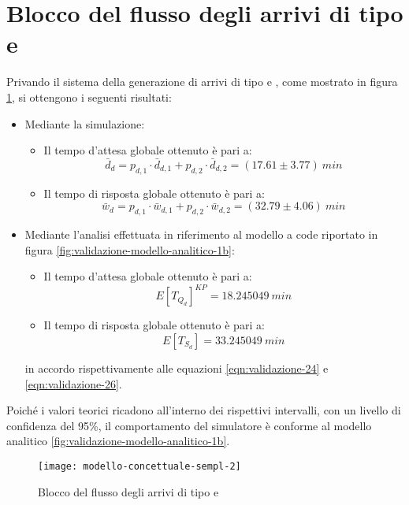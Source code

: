 \section{Blocco del flusso degli arrivi di tipo \uo{} e \pp{}}
Privando il sistema della generazione di arrivi di tipo \uo{} e \pp{}, come mostrato in figura \ref{fig:modello-concettuale-semp-2}, si ottengono i seguenti risultati:
\begin{itemize}
\item Mediante la simulazione:
\begin{itemize}
\item Il tempo d'attesa globale ottenuto è pari a:
\begin{equation} 
\bar{d}_d = p_{d,1}\cdot \bar{d}_{d,1} + p_{d,2}\cdot \bar{d}_{d,2} = (17.61 \pm 3.77)\ min
\end{equation}
\item Il tempo di risposta globale ottenuto è pari a:
\begin{equation}
\bar{w}_d = p_{d,1}\cdot \bar{w}_{d,1} + p_{d,2}\cdot \bar{w}_{d,2} = (32.79 \pm 4.06)\ min
\end{equation}
\end{itemize}

\item Mediante l'analisi effettuata in riferimento al modello a code riportato in figura \ref{fig:validazione-modello-analitico-1b}:
\begin{itemize}
\item Il tempo d'attesa globale ottenuto è pari a:
\begin{equation}
E[T_{Q_d}]^{KP} = 18.245049\ min 
\end{equation}
\item Il tempo di risposta globale ottenuto è pari a:
\begin{equation}
E[T_{S_d}] = 33.245049\ min 
\end{equation}
\end{itemize}
in accordo rispettivamente alle equazioni \ref{eqn:validazione-24} e \ref{eqn:validazione-26}.
\end{itemize}

Poiché i valori teorici ricadono all'interno dei rispettivi intervalli, con un livello di confidenza del 95\%, il comportamento del simulatore è conforme al modello analitico \ref{fig:validazione-modello-analitico-1b}.

\begin{figure}[ht]
\centering
\texttt{[image: modello-concettuale-sempl-2]}
\caption{Blocco del flusso degli arrivi di tipo \uo{} e \pp{}}
\label{fig:modello-concettuale-semp-2}
\end{figure}
